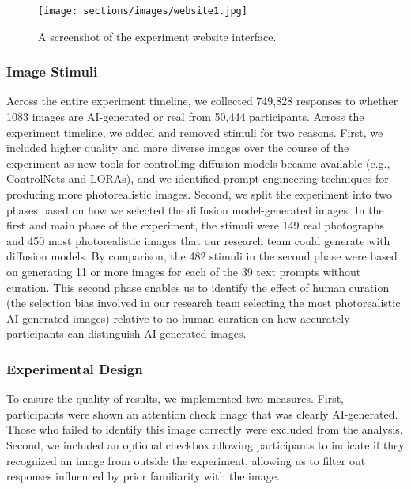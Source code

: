 \begin{figure}[htb]
    \centering
    \texttt{[image: sections/images/website1.jpg]}  
    \caption{A screenshot of the experiment website interface. }
    \label{fig:website}
\end{figure}


\subsubsection{Image Stimuli}
\label{sec:imagestimuli}

Across the entire experiment timeline, we collected 749,828 responses to whether 1083 images are AI-generated or real from 50,444 participants. Across the experiment timeline, we added and removed stimuli for two reasons. First, we included higher quality and more diverse images over the course of the experiment as new tools for controlling diffusion models became available (e.g., ControlNets and LORAs), and we identified prompt engineering techniques for producing more photorealistic images. Second, we split the experiment into two phases based on how we selected the diffusion model-generated images. In the first and main phase of the experiment, the stimuli were 149 real photographs and 450 most photorealistic images that our research team could generate with diffusion models. By comparison, the 482 stimuli in the second phase were based on generating 11 or more images for each of the 39 text prompts without curation. This second phase enables us to identify the effect of human curation (the selection bias involved in our research team selecting the most photorealistic AI-generated images) relative to no human curation on how accurately participants can distinguish AI-generated images.

\subsubsection{Experimental Design}\label{exp-design}

To ensure the quality of results, we implemented two measures. First, participants were shown an attention check image that was clearly AI-generated. Those who failed to identify this image correctly were excluded from the analysis. Second, we included an optional checkbox allowing participants to indicate if they recognized an image from outside the experiment, allowing us to filter out responses influenced by prior familiarity with the image. 


